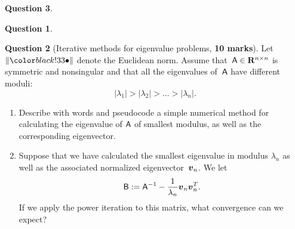 \documentclass[11pt]{article}
\theoremstyle{definition}
\newtheorem{question}{Question}
\theoremstyle{remark}
\theoremstyle{plain}%
\begin{document}
\begin{question}
\begin{question}
\begin{enumerate}



    \end{enumerate}
\end{question}

\newpage

\newpage

\newpage
\begin{question}
    [Iterative methods for eigenvalue problems, \textbf{10 marks}]
    Let $\norm{\placeholder}$ denote the Euclidean norm.
    Assume that~$\mathsf A \in \mathbf R^{n \times n}$ is symmetric and nonsingular
    and that all the eigenvalues of~$\mathsf A$ have different moduli:
    \[
        \lvert \lambda_1 \rvert
        >
        \lvert \lambda_2 \rvert
        >
        \dots
        >
        \lvert \lambda_n \rvert.
    \]

    \begin{enumerate}
        \item
            Describe with words and pseudocode a simple numerical method for calculating the eigenvalue of $\mathsf A$ of smallest modulus,
            as well as the corresponding eigenvector.

        \item
            Suppose that we have calculated the smallest eigenvalue in modulus $\lambda_n$ as well as the associated normalized eigenvector~$\mathbf{\boldsymbol{v}}_n$.
            We let
            \[
                \mathsf B := \mathsf A^{-1} - \frac{1}{\lambda_n} \mathbf{\boldsymbol{v}}_n \mathbf{\boldsymbol{v}}_n^T.
            \]
            If we apply the power iteration to this matrix,
            what convergence can we expect?



\end{enumerate}
\end{question}
\end{question}
\end{document}
